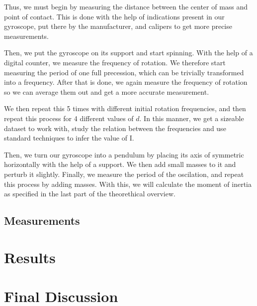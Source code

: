 \documentclass[a4paper,12pt]{article}
\begin{document}
Thus, we must begin by measuring the distance between the center of mass and point of contact. This is done with the help of indications present in our gyroscope, put there
by the manufacturer, and calipers to get more precise measurements.

Then, we put the gyroscope on its support and start spinning. With the help of a digital counter, we measure the frequency of rotation. 
We therefore start measuring the period of one full precession, which can be trivially transformed into a frequency. After that is done, we again measure the frequency of rotation so we can average them out and get a more accurate measurement.

We then repeat this 5 times with different initial rotation frequencies, and then repeat this process for 4 different values of $d$.
In this manner, we get a sizeable dataset to work with, study the relation between the frequencies and use standard techniques to infer the value of I. 

Then, we turn our gyroscope into a pendulum by placing its axis of symmetric horizontally with the help of a support. We then 
add small masses to it and perturb it slightly. Finally, we measure the period of the oscilation, and repeat this process by adding masses.
With this, we will calculate the moment of inertia as specified in the last part of the theorethical overview.
\subsection{Measurements}

\section{Results}

\section{Final Discussion}
\end{document}
